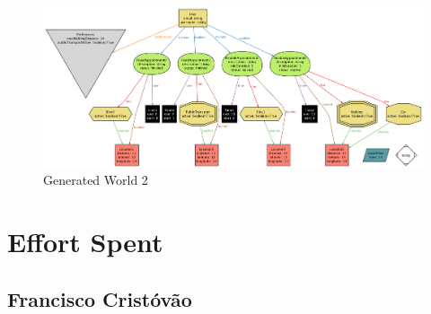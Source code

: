 \documentclass[12pt]{article}
\begin{document}
\begin{figure}[H]
        \includegraphics[scale=0.46, angle=-90, origin=c]{generatedWorld2.png}
        \centering
        \caption{Generated World 2}
    \label{fig:execDetail}
\end{figure}

\section{Effort Spent}
\subsection{Francisco Cristóvão}
\end{document}
